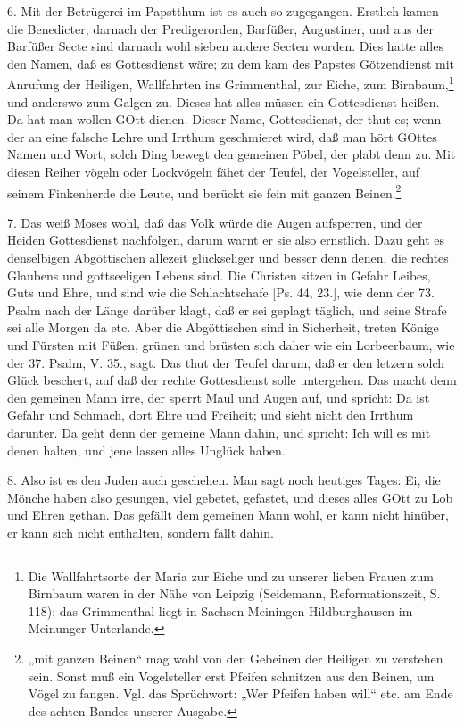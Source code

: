 6. Mit der Betrügerei im Papstthum ist es auch so zugegangen. Erstlich kamen die Benedicter, darnach der Predigerorden, Barfüßer, Augustiner, und aus der Barfüßer Secte sind darnach wohl sieben andere Secten worden. Dies hatte alles den Namen, daß es Gottesdienst wäre; zu dem kam des Papstes Götzendienst mit Anrufung der Heiligen, Wallfahrten ins Grimmenthal, zur Eiche, zum Birnbaum,\footnote{Die Wallfahrtsorte der Maria zur Eiche und zu unserer lieben Frauen zum Birnbaum waren in der Nähe von Leipzig (Seidemann, Reformationszeit, S. 118); das Grimmenthal liegt in Sachsen-Meiningen-Hildburghausen im Meinunger Unterlande.} und anderswo zum Galgen zu. Dieses hat alles müssen ein Gottesdienst heißen. Da hat man wollen GOtt dienen. Dieser Name, Gottesdienst, der thut es; wenn der an eine falsche Lehre und Irrthum geschmieret wird, daß man hört GOttes Namen und Wort, solch Ding bewegt den gemeinen Pöbel, der plabt denn zu. Mit diesen Reiher vögeln oder Lockvögeln fähet der Teufel, der Vogelsteller, auf seinem Finkenherde die Leute, und berückt sie fein mit ganzen Beinen.\footnote{„mit ganzen Beinen“ mag wohl von den Gebeinen der Heiligen zu verstehen sein. Sonst muß ein Vogelsteller erst Pfeifen schnitzen aus den Beinen, um Vögel zu fangen. Vgl. das Sprüchwort: „Wer Pfeifen haben will“ etc. am Ende des achten Bandes unserer Ausgabe.}

7. Das weiß Moses wohl, daß das Volk würde die Augen aufsperren, und der Heiden Gottesdienst nachfolgen, darum warnt er sie also ernstlich. Dazu geht es denselbigen Abgöttischen allezeit glückseliger und besser denn denen, die rechtes Glaubens und gottseeligen Lebens sind. Die Christen sitzen in Gefahr Leibes, Guts und Ehre, und sind wie die Schlachtschafe [Ps. 44, 23.], wie denn der 73. Psalm nach der Länge darüber klagt, daß er sei geplagt täglich, und seine Strafe sei alle Morgen da etc. Aber die Abgöttischen sind in Sicherheit, treten Könige und Fürsten mit Füßen, grünen und brüsten sich daher wie ein Lorbeerbaum, wie der 37. Psalm, V. 35., sagt. Das thut der Teufel darum, daß er den letzern solch Glück beschert, auf daß der rechte Gottesdienst solle untergehen. Das macht denn den gemeinen Mann irre, der sperrt Maul und Augen auf, und spricht: Da ist Gefahr und Schmach, dort Ehre und Freiheit; und sieht
nicht den Irrthum darunter. Da geht denn der gemeine Mann dahin, und spricht: Ich will es mit denen halten, und jene lassen alles Unglück haben.

8. Also ist es den Juden auch geschehen. Man sagt noch heutiges Tages: Ei, die Mönche haben also gesungen, viel gebetet, gefastet, und dieses alles GOtt zu Lob und Ehren gethan. Das gefällt dem gemeinen Mann wohl, er kann nicht hinüber, er kann sich nicht enthalten, sondern fällt dahin.

